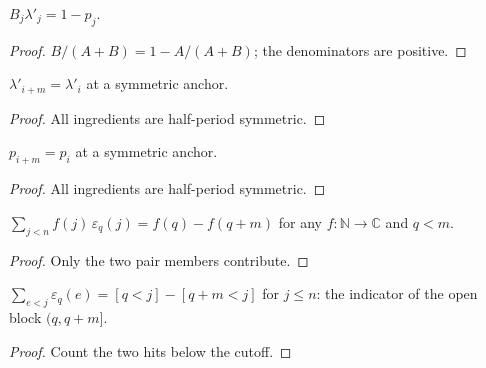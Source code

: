 \begin{lemma}\leanok
[share relation $B\lambda' = 1 - p$]
  \label{lem:head_slot_mul_lambda}
  $B_j \lambda'_j = 1 - p_j$.
\end{lemma}
\begin{proof}

\leanok
  $B/(A+B) = 1 - A/(A+B)$; the denominators are positive.
\end{proof}

\begin{lemma}
  \label{lem:jacobian_lambda_add_half}
  $\lambda'_{i+m} = \lambda'_i$ at a symmetric anchor.
\end{lemma}
\begin{proof}

\leanok
  All ingredients are half-period symmetric.
\end{proof}

\begin{lemma}
  \label{lem:jacobian_share_add_half}
  $p_{i+m} = p_i$ at a symmetric anchor.
\end{lemma}
\begin{proof}

\leanok
  All ingredients are half-period symmetric.
\end{proof}

\begin{lemma}
  \label{lem:sum_mul_pair_sign}
  $\sum_{j<n} f(j)\,\varepsilon_q(j) = f(q) - f(q+m)$ for any
  $f : \mathbb{N} \to \mathbb{C}$ and $q < m$.
\end{lemma}
\begin{proof}

\leanok
  Only the two pair members contribute.
\end{proof}

\begin{lemma}
  \label{lem:sum_pair_sign_range}
  $\sum_{e<j} \varepsilon_q(e) = [q < j] - [q + m < j]$ for $j \le n$:
  the indicator of the open block $(q, q+m]$.
\end{lemma}
\begin{proof}

\leanok
  Count the two hits below the cutoff.
\end{proof}

